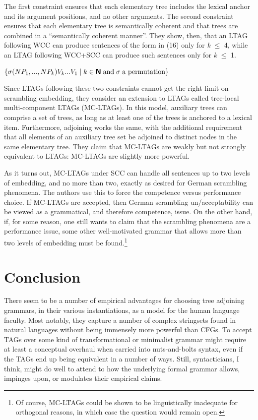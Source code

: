 \documentclass[12pt]{article}
\newcommand{\func}[1]{\textbf{\textsf{#1}}}
\begin{document}
The first constraint ensures that each elementary tree includes the lexical anchor and its argument positions, and no other arguments. The second constraint ensures that each elementary tree is semantically coherent and that trees are combined in a ``semantically coherent manner''. They show, then, that an LTAG following WCC can produce sentences of the form in (16) only for \textit{k} $\leq$ 4, while an LTAG following WCC+SCC can produce such sentences only for \textit{k} $\leq$ 1.

\ex $\{\sigma(NP_1, ..., NP_k)V_k ... V_1 \; | \; k \in \func{N} \; \textrm{and}\;  \sigma \; \textrm{a permutation}\}$
\xe

Since LTAGs following these two constraints cannot get the right limit on scrambling embedding, they consider an extension to LTAGs called tree-local multi-component LTAGs (MC-LTAGs). In this model, auxiliary trees can comprise a set of trees, as long as at least one of the trees is anchored to a lexical item. Furthermore, adjoining works the same, with the additional requirement that all elements of an auxiliary tree set be adjoined to distinct nodes in the same elementary tree. They claim that MC-LTAGs are weakly but not strongly equivalent to LTAGs: MC-LTAGs are slightly more powerful.

As it turns out, MC-LTAGs under SCC can handle all sentences up to two levels of embedding, and no more than two, exactly as desired for German scrambling phenomena. The authors use this to force the competence versus performance choice. If MC-LTAGs are accepted, then German scrambling un/acceptability can be viewed as a grammatical, and therefore competence, issue. On the other hand, if, for some reason, one still wants to claim that the scrambling phenomena are a performance issue, some other well-motivated grammar that allows more than two levels of embedding must be found.\footnote{Of course, MC-LTAGs could be shown to be linguistically inadequate for orthogonal reasons, in which case the question would remain open.}

\section{Conclusion}

There seem to be a number of empirical advantages for choosing tree adjoining grammars, in their various instantiations, as a model for the human language faculty. Most notably, they capture a number of complex stringsets found in natural languages without being immensely more powerful than CFGs. To accept TAGs over some kind of transformational or minimalist grammar might require at least a conceptual overhaul when carried into nuts-and-bolts syntax, even if the TAGs end up being equivalent in a number of ways. Still, syntacticians, I think, might do well to attend to how the underlying formal grammar allows, impinges upon, or modulates their empirical claims.
\end{document}

